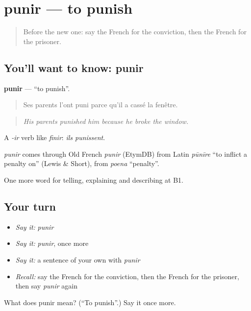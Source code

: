 \section[punir]{punir — to punish}

\label{lesson:FR-C388-punir}



\begin{quote}
Before the new one: say the French for the conviction, then the French for the prisoner.
\end{quote}

\subsection*{You'll want to know: punir}
\textbf{punir} — \textquotedblleft{}to punish\textquotedblright{}.

\begin{quote}
Ses parents l'ont puni parce qu'il a cassé la fenêtre.
\end{quote}

\begin{quote}
\emph{His parents punished him because he broke the window.}
\end{quote}

A \emph{-ir} verb like \emph{finir}: \emph{ils punissent}.

\begin{cousinweb}
\emph{punir} comes through Old French \emph{punir} (EtymDB) from Latin \emph{pūnīre} \textquotedblleft{}to inflict a penalty on\textquotedblright{} (Lewis \& Short), from \emph{poena} \textquotedblleft{}penalty\textquotedblright{}.
\end{cousinweb}

\begin{grammarlens}[title={What you've built}]
One more word for telling, explaining and describing at B1.
\end{grammarlens}

\subsection*{Your turn}
\begin{itemize}
\raggedright
  \item \emph{Say it:} \emph{punir}
  \item \emph{Say it:} \emph{punir}, once more
  \item \emph{Say it:} a sentence of your own with \emph{punir}
  \item \emph{Recall:} say the French for the conviction, then the French for the prisoner, then say \emph{punir} again
\end{itemize}

\begin{tcolorbox}[breakable,colback=teal!4,colframe=teal!35!black,title={Before you move on}]
What does punir mean? (\textquotedblleft{}To punish\textquotedblright{}.) Say it once more.
\end{tcolorbox}

